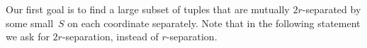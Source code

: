 	
	Our first goal is to find a large subset of tuples that are mutually $2r$-separated by some small~$S$ on each coordinate separately.
	Note that in the following statement we ask for $2r$-separation, instead of $r$-separation.

